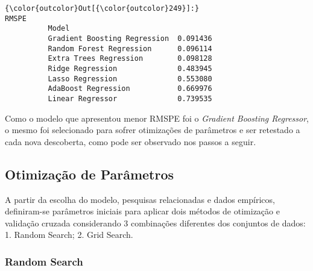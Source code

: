\documentclass[11pt]{article}
\begin{document}
\begin{Verbatim}[commandchars=\\\{\}]
{\color{outcolor}Out[{\color{outcolor}249}]:}                                  RMSPE
          Model                                 
          Gradient Boosting Regression  0.091436
          Random Forest Regression      0.096114
          Extra Trees Regression        0.098128
          Ridge Regression              0.483945
          Lasso Regression              0.553080
          AdaBoost Regression           0.669976
          Linear Regressor              0.739535
\end{Verbatim}
            
    Como o modelo que apresentou menor RMSPE foi o \emph{Gradient Boosting
Regressor}, o mesmo foi selecionado para sofrer otimizações de
parâmetros e ser retestado a cada nova descoberta, como pode ser
observado nos passos a seguir.

    \hypertarget{otimizauxe7uxe3o-de-paruxe2metros}{%
\subsection{Otimização de
Parâmetros}\label{otimizauxe7uxe3o-de-paruxe2metros}}

    A partir da escolha do modelo, pesquisas relacionadas e dados empíricos,
definiram-se parâmetros iniciais para aplicar dois métodos de otimização
e validação cruzada considerando 3 combinações diferentes dos conjuntos
de dados: 1. Random Search; 2. Grid Search.

    \hypertarget{random-search}{%
\subsubsection{Random Search}\label{random-search}}
\end{document}
